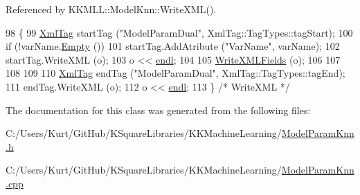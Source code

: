 Referenced by K\+K\+M\+L\+L\+::\+Model\+Knn\+::\+Write\+X\+M\+L().


\begin{DoxyCode}
98 \{
99   \hyperlink{class_k_k_b_1_1_xml_tag}{XmlTag}  startTag (\textcolor{stringliteral}{"ModelParamDual"},  XmlTag::TagTypes::tagStart);
100   \textcolor{keywordflow}{if}  (!varName.\hyperlink{class_k_k_b_1_1_k_k_str_ac69942f73fffd672ec2a6e1c410afdb6}{Empty} ())
101     startTag.AddAtribute (\textcolor{stringliteral}{"VarName"}, varName);
102   startTag.WriteXML (o);
103   o << \hyperlink{namespace_k_k_b_ad1f50f65af6adc8fa9e6f62d007818a8}{endl};
104 
105   \hyperlink{class_k_k_m_l_l_1_1_model_param_a91dc06ec604cf9c2a045991e9b88b5d3}{WriteXMLFields} (o);
106 
107 
108 
109 
110   \hyperlink{class_k_k_b_1_1_xml_tag}{XmlTag}  endTag (\textcolor{stringliteral}{"ModelParamDual"}, XmlTag::TagTypes::tagEnd);
111   endTag.WriteXML (o);
112   o << \hyperlink{namespace_k_k_b_ad1f50f65af6adc8fa9e6f62d007818a8}{endl};
113 \}  \textcolor{comment}{/* WriteXML */}
\end{DoxyCode}


The documentation for this class was generated from the following files\+:\begin{DoxyCompactItemize}
\item 
C\+:/\+Users/\+Kurt/\+Git\+Hub/\+K\+Square\+Libraries/\+K\+K\+Machine\+Learning/\hyperlink{_model_param_knn_8h}{Model\+Param\+Knn.\+h}\item 
C\+:/\+Users/\+Kurt/\+Git\+Hub/\+K\+Square\+Libraries/\+K\+K\+Machine\+Learning/\hyperlink{_model_param_knn_8cpp}{Model\+Param\+Knn.\+cpp}\end{DoxyCompactItemize}
